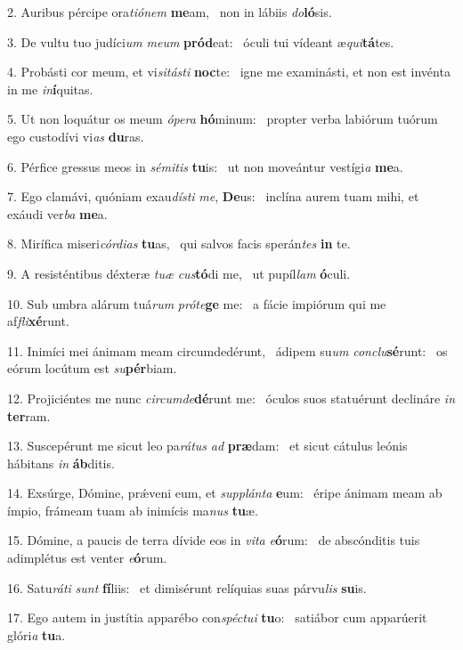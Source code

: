 2. Auribus pércipe ora\textit{ti}\textit{ó}\textit{nem} \textbf{me}am, \ast\  non in lábiis \textit{do}\textbf{ló}sis.\

3. De vultu tuo judíci\textit{um} \textit{me}\textit{um} \textbf{pród}eat: \ast\  óculi tui vídeant æ\textit{qui}\textbf{tá}tes.\

4. Probásti cor meum, et vi\textit{si}\textit{tás}\textit{ti} \textbf{noc}te: \ast\  igne me examinásti, et non est invénta in me \textit{in}\textbf{í}quitas.\

5. Ut non loquátur os meum \textit{ó}\textit{pe}\textit{ra} \textbf{hó}minum: \ast\  propter verba labiórum tuórum ego custodívi vi\textit{as} \textbf{du}ras.\

6. Pérfice gressus meos in \textit{sé}\textit{mi}\textit{tis} \textbf{tu}is: \ast\  ut non moveántur vestígi\textit{a} \textbf{me}a.\

7. Ego clamávi, quóniam exau\textit{dís}\textit{ti} \textit{me}, \textbf{De}us: \ast\  inclína aurem tuam mihi, et exáudi ver\textit{ba} \textbf{me}a.\

8. Mirífica miseri\textit{cór}\textit{di}\textit{as} \textbf{tu}as, \ast\  qui salvos facis sperán\textit{tes} \textbf{in} te.\

9. A resisténtibus déxteræ \textit{tu}\textit{æ} \textit{cus}\textbf{tó}di me, \ast\  ut pupíl\textit{lam} \textbf{ó}culi.\

10. Sub umbra alárum tuá\textit{rum} \textit{pró}\textit{te}\textbf{ge} me: \ast\  a fácie impiórum qui me af\textit{fli}\textbf{xé}runt.\

11. Inimíci mei ánimam meam circumdedérunt, \dag\  ádipem su\textit{um} \textit{con}\textit{clu}\textbf{sé}runt: \ast\  os eórum locútum est \textit{su}\textbf{pér}biam.\

12. Projiciéntes me nunc \textit{cir}\textit{cum}\textit{de}\textbf{dé}runt me: \ast\  óculos suos statuérunt declináre \textit{in} \textbf{ter}ram.\

13. Suscepérunt me sicut leo pa\textit{rá}\textit{tus} \textit{ad} \textbf{præ}dam: \ast\  et sicut cátulus leónis hábitans \textit{in} \textbf{áb}ditis.\

14. Exsúrge, Dómine, prǽveni eum, et \textit{sup}\textit{plán}\textit{ta} \textbf{e}um: \ast\  éripe ánimam meam ab ímpio, frámeam tuam ab inimícis ma\textit{nus} \textbf{tu}æ.\

15. Dómine, a paucis de terra dívide eos in \textit{vi}\textit{ta} \textit{e}\textbf{ó}rum: \ast\  de abscónditis tuis adimplétus est venter \textit{e}\textbf{ó}rum.\

16. Satu\textit{rá}\textit{ti} \textit{sunt} \textbf{fí}liis: \ast\  et dimisérunt relíquias suas párvu\textit{lis} \textbf{su}is.\

17. Ego autem in justítia apparébo con\textit{spéc}\textit{tu}\textit{i} \textbf{tu}o: \ast\  satiábor cum apparúerit glóri\textit{a} \textbf{tu}a.\


